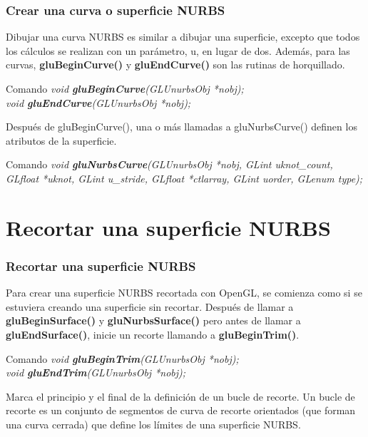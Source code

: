 \documentclass[10.5pt]{beamer}
\begin{document}

\begin{frame}[fragile]
\frametitle{Crear una curva o superficie NURBS}
\small
Dibujar una curva NURBS es similar a dibujar una superficie, excepto
que todos los cálculos se realizan con un parámetro, u, en lugar de dos.
Además, para las curvas, \textbf{gluBeginCurve()} y \textbf{gluEndCurve()} son las
rutinas de horquillado.

\begin{alertblock}{Comando}
    \small
    \emph{void \textbf{gluBeginCurve}(GLUnurbsObj *nobj);}\\
    \emph{void \textbf{gluEndCurve}(GLUnurbsObj *nobj);}
\end{alertblock}

Después de gluBeginCurve(), una o más llamadas a
gluNurbsCurve() definen los atributos de la superficie.

\begin{alertblock}{Comando}
    \small
    \emph{void \textbf{gluNurbsCurve}(GLUnurbsObj *nobj, GLint uknot\_count,
    GLfloat *uknot, GLint u\_stride, GLfloat *ctlarray,
    GLint uorder, GLenum type);}
\end{alertblock}

\end{frame}


\section{Recortar una superficie NURBS}
\begin{frame}[fragile]
\frametitle{Recortar una superficie NURBS}
\small
Para crear una superficie NURBS recortada con OpenGL, se comienza como
si se estuviera creando una superficie sin recortar.
Después de llamar a \textbf{gluBeginSurface()} y \textbf{gluNurbsSurface()}
pero antes de llamar a \textbf{gluEndSurface()}, inicie un recorte
llamando a \textbf{gluBeginTrim()}.

\begin{alertblock}{Comando}
    \small
    \emph{void \textbf{gluBeginTrim}(GLUnurbsObj *nobj);}\\
    \emph{void \textbf{gluEndTrim}(GLUnurbsObj *nobj);}
\end{alertblock}

Marca el principio y el final de la definición
de un bucle de recorte. Un bucle de recorte es un conjunto
de segmentos de curva de recorte orientados (que forman
una curva cerrada) que define los límites de una superficie NURBS.

\end{frame}
\end{document}
